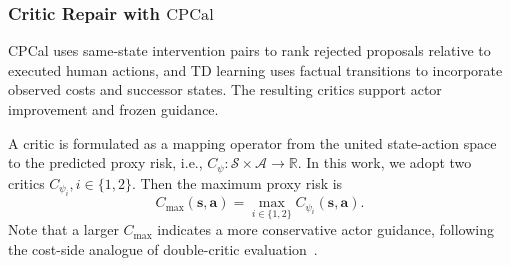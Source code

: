 \documentclass[9pt,journal]{IEEEtran}
\newcommand{\CPCal}{\ensuremath{\mathrm{CPCal}}}
\newcommand{\Sset}{\mathcal{S}}
\newcommand{\A}{\mathcal{A}}
\newcommand{\ER}{\ensuremath{\mathrm{ER}}}
\newcommand{\va}{\bm{a}}
\newcommand{\vs}{\bm{s}}
\begin{document}
\subsubsection{Critic Repair with \CPCal{}}
\label{sec:cpcal}

CPCal uses same-state
intervention pairs to rank rejected proposals relative
to executed human actions, and TD learning uses
factual transitions to incorporate observed costs and
successor states. The resulting critics support actor
improvement and frozen guidance.

A critic is formulated as a mapping operator from the united state-action space to the predicted proxy risk, i.e., $C_{\psi}:\Sset\times\A\rightarrow\mathbb R$. In this work, we adopt two critics $C_{\psi_i},i\in\{1,2\}$. %
Then the maximum proxy risk is 
\begin{equation}
    C_{\max}\!\left(\vs,\va\right)
    =
    \max_{i\in\{1,2\}}
    C_{\psi_i}\!\left(\vs,\va\right).
    \label{eq:cmax}
\end{equation}
Note that a larger $C_{\max}$ indicates a more conservative actor guidance, following the cost-side analogue of double-critic evaluation~\cite{fujimoto2018td3}.
\end{document}
